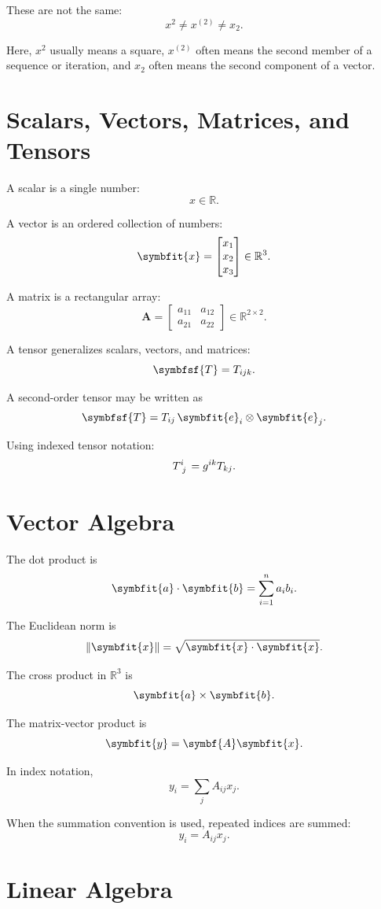 \documentclass[11pt,twocolumn]{article}
\newcommand{\R}{\mathbb{R}}
\newcommand{\vct}[1]{\symbfit{#1}}   %
\newcommand{\mat}[1]{\symbf{#1}}     %
\newcommand{\ten}[1]{\symbfsf{#1}}   %
\newcommand{\norm}[1]{\left\lVert #1 \right\rVert}
\begin{document}
These are not the same:
\[
x^2
\ne
x^{(2)}
\ne
x_2.
\]

Here, \(x^2\) usually means a square, \(x^{(2)}\) often means the second
member of a sequence or iteration, and \(x_2\) often means the second
component of a vector.

\section{Scalars, Vectors, Matrices, and Tensors}

A scalar is a single number:
\[
x \in \R.
\]

A vector is an ordered collection of numbers:
\[
\vct{x}
=
\begin{bmatrix}
x_1 \\
x_2 \\
x_3
\end{bmatrix}
\in \R^3.
\]

A matrix is a rectangular array:
\[
\mat{A}
=
\begin{bmatrix}
a_{11} & a_{12} \\
a_{21} & a_{22}
\end{bmatrix}
\in \R^{2\times 2}.
\]

A tensor generalizes scalars, vectors, and matrices:
\[
\ten{T}
=
T_{ijk}.
\]

A second-order tensor may be written as
\[
\ten{T}
=
T_{ij}\,\vct{e}_i \otimes \vct{e}_j.
\]

Using indexed tensor notation:
\[
\tensor{T}{^i_j}
=
g^{ik}T_{kj}.
\]

\section{Vector Algebra}

The dot product is
\[
\vct{a}\cdot\vct{b}
=
\sum_{i=1}^{n} a_i b_i.
\]

The Euclidean norm is
\[
\norm{\vct{x}}
=
\sqrt{\vct{x}\cdot\vct{x}}.
\]

The cross product in \(\R^3\) is
\[
\vct{a}\times\vct{b}.
\]

The matrix-vector product is
\[
\vct{y}
=
\mat{A}\vct{x}.
\]

In index notation,
\[
y_i
=
\sum_j A_{ij}x_j.
\]

When the summation convention is used, repeated indices are summed:
\[
y_i = A_{ij}x_j.
\]

\section{Linear Algebra}
\end{document}
